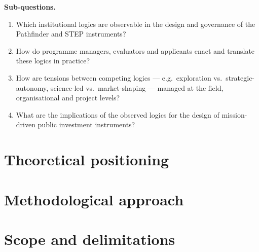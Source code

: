 \medskip
\noindent\textbf{Sub-questions.}
\begin{enumerate}[label=\textbf{SQ\arabic*.},leftmargin=*]
    \item Which institutional logics are observable in the design and
          governance of the Pathfinder and STEP instruments?
    \item How do programme managers, evaluators and applicants enact and
          translate these logics in practice?
    \item How are tensions between competing logics — e.g.\ exploration
          vs.\ strategic-autonomy, science-led vs.\ market-shaping — managed
          at the field, organisational and project levels?
    \item What are the implications of the observed logics for the design
          of mission-driven public investment instruments?
\end{enumerate}

\section{Theoretical positioning}
\label{sec:intro-theory}

\section{Methodological approach}
\label{sec:intro-method}

\section{Scope and delimitations}
\label{sec:intro-scope}

